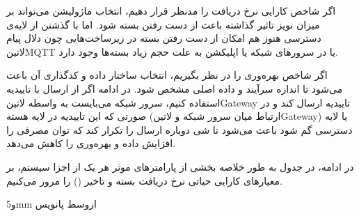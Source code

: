 اگر شاخص کارایی نرخ دریافت را مدنظر قرار دهیم، انتخاب ماژولیشن می‌تواند بر میزان نویز تاثیر گذاشته باعث از دست رفتن بسته شود.
اما با گذشتن از لایه‌ی دسترسی هنوز هم امکان از دست رفتن بسته در زیرساخت‌هایی چون دلال پیام ‌لاتین{MQTT} یا در سرورهای
شبکه یا اپلیکشن به علت حجم زیاد بسته‌ها وجود دارد.

اگر شاخص بهره‌وری را در نظر بگیریم، انتخاب ساختار داده و کدگذاری آن باعث می‌شود تا اندازه سرآیند و داده اصلی مشخص شود.
در ادامه اگر از ارسال با تاییدیه استفاده کنیم، سرور شبکه می‌بایست به واسطه ‌لاتین{Gateway} تاییدیه ارسال کند و در صورتی
که این تاییدیه در لایه هسته (ارتباط میان سرور شبکه و ‌لاتین{Gateway}) یا لایه دسترسی گم شود باعث می‌شود تا شی
دوباره ارسال را تکرار کند که توان مصرفی را افزایش داده و بهره‌وری را کاهش می‌دهد.

در ادامه، در جدول 
به طور خلاصه بخشی از پارامترهای موثر هر یک از اجزا سیستم،
بر معیارهای کارایی حیاتی نرخ دریافت بسته و تاخیر () را مرور می‌کنیم.


‌و{5mm}
‌ازوسط
‌پانویس

